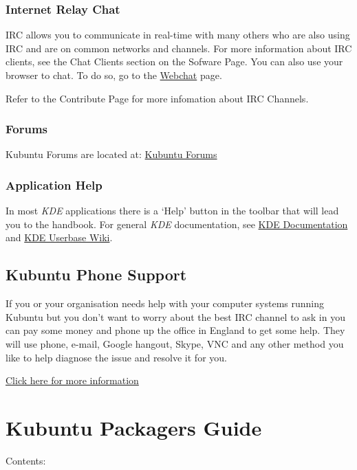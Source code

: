 \documentclass[letterpaper,10pt,english]{sphinxmanual}
\begin{document}
\subsection{Internet Relay Chat}
\label{docs/support:internet-relay-chat}
IRC allows you to communicate in real-time with many others who are also using IRC and are on common networks and channels. For more information about IRC clients, see the Chat Clients section on the Sofware Page. You can also use your browser to chat. To do so, go to the \href{http://webchat.freenode.net/}{Webchat} page.

Refer to the Contribute Page for more infomation about IRC Channels.


\subsection{Forums}
\label{docs/support:forums}
Kubuntu Forums are located at: \href{https://www.kubuntuforums.net/content.php}{Kubuntu Forums}


\subsection{Application Help}
\label{docs/support:application-help}
In most \emph{KDE} applications there is a `Help' button in the toolbar that will lead you to the handbook. For general \emph{KDE} documentation, see \href{https://www.kde.org/documentation/}{KDE Documentation} and \href{https://userbase.kde.org/Special:MyLanguage/Welcome\_to\_KDE\_UserBase}{KDE Userbase Wiki}.


\section{Kubuntu Phone Support}
\label{docs/support:kubuntu-phone-support}
If you or your organisation needs help with your computer systems running Kubuntu but you don't want to worry about the best IRC channel to ask in you can pay some money and phone up the office in England to get some help. They will use phone, e-mail, Google hangout, Skype, VNC and any other method you like to help diagnose the issue and resolve it for you.

\href{http://kubuntu.emerge-open.com/buy}{Click here for more information}


\chapter{Kubuntu Packagers Guide}
\label{docs/packaging_guide/packaging:kubuntu-packagers-guide}\label{docs/packaging_guide/packaging::doc}
Contents:
\end{document}
